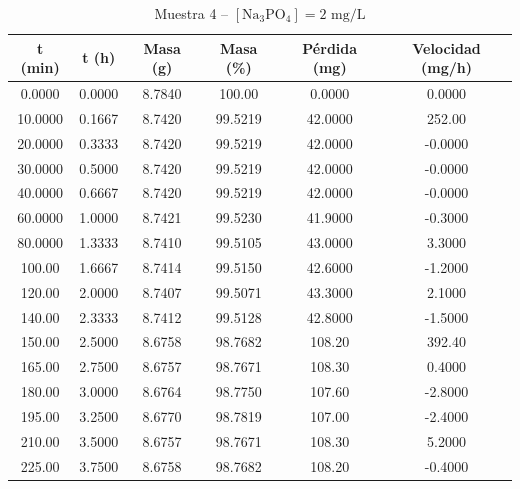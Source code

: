\documentclass[11pt,a4paper]{article}
\begin{document}
\begin{table}[H]
\centering
\caption{Muestra 4 -- $[\text{Na}_3\text{PO}_4] = 2\text{ mg/L}$}
\label{tab:3_4_c2_m4}
\begin{tabular}{cccccc}
\toprule
t (min) & t (h) & Masa (g) & Masa (\%) & Pérdida (mg) & Velocidad (mg/h) \\
\midrule
0.0000 & 0.0000 & 8.7840 & 100.00 & 0.0000 & 0.0000 \\
10.0000 & 0.1667 & 8.7420 & 99.5219 & 42.0000 & 252.00 \\
20.0000 & 0.3333 & 8.7420 & 99.5219 & 42.0000 & -0.0000 \\
30.0000 & 0.5000 & 8.7420 & 99.5219 & 42.0000 & -0.0000 \\
40.0000 & 0.6667 & 8.7420 & 99.5219 & 42.0000 & -0.0000 \\
60.0000 & 1.0000 & 8.7421 & 99.5230 & 41.9000 & -0.3000 \\
80.0000 & 1.3333 & 8.7410 & 99.5105 & 43.0000 & 3.3000 \\
100.00 & 1.6667 & 8.7414 & 99.5150 & 42.6000 & -1.2000 \\
120.00 & 2.0000 & 8.7407 & 99.5071 & 43.3000 & 2.1000 \\
140.00 & 2.3333 & 8.7412 & 99.5128 & 42.8000 & -1.5000 \\
150.00 & 2.5000 & 8.6758 & 98.7682 & 108.20 & 392.40 \\
165.00 & 2.7500 & 8.6757 & 98.7671 & 108.30 & 0.4000 \\
180.00 & 3.0000 & 8.6764 & 98.7750 & 107.60 & -2.8000 \\
195.00 & 3.2500 & 8.6770 & 98.7819 & 107.00 & -2.4000 \\
210.00 & 3.5000 & 8.6757 & 98.7671 & 108.30 & 5.2000 \\
225.00 & 3.7500 & 8.6758 & 98.7682 & 108.20 & -0.4000 \\
\bottomrule
\end{tabular}
\end{table}
\end{document}
